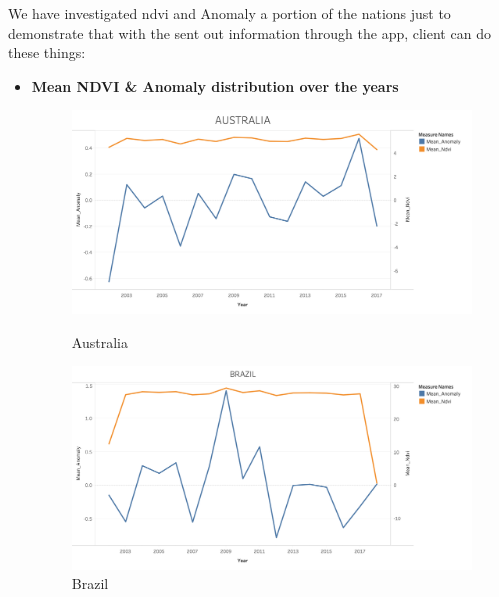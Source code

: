 We have investigated \gls{ndvi} and Anomaly a portion of the nations just to demonstrate that with the sent out information through the app, client can do these things:

\newpage

\begin{itemize}
    \item \centerline{\textbf{Mean NDVI \& Anomaly distribution over the years}}
    
    \begin{figure}[!htb]
        \begin{minipage}{0.5\textwidth}
            \centering
            \includegraphics[width=1.0\linewidth]{figures/ch5/Mean/AUSTRALIA_mean.png}
            \caption{Australia}\label{Fig:AUSTRALIA_mean}
        \end{minipage}\hfill
        \begin{minipage}{0.5\textwidth}
            \centering
            \includegraphics[width=1.0\linewidth]{figures/ch5/Mean/BRAZIL_mean.png}
            \caption{Brazil}\label{Fig:BRAZIL_mean}
        \end{minipage}
    \end{figure}
    

\end{itemize}
